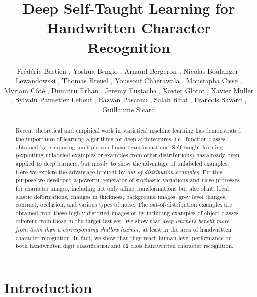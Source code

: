 \documentclass{article} %
\title{Deep Self-Taught Learning for Handwritten Character Recognition}
\author{
Frédéric  Bastien , 
Yoshua  Bengio , 
Arnaud  Bergeron , 
Nicolas  Boulanger-Lewandowski ,
Thomas  Breuel , 
Youssouf  Chherawala , 
Moustapha  Cisse , 
Myriam  Côté , 
Dumitru  Erhan ,
Jeremy  Eustache ,
Xavier  Glorot , 
Xavier  Muller ,
Sylvain  Pannetier Lebeuf ,
Razvan  Pascanu , 
Salah  Rifai , 
Francois  Savard , 
Guillaume  Sicard 
}
\begin{document}
\maketitle

\vspace*{-2mm}
\begin{abstract}
  Recent theoretical and empirical work in statistical machine learning has
  demonstrated the importance of learning algorithms for deep
  architectures, i.e., function classes obtained by composing multiple
  non-linear transformations. Self-taught learning (exploiting unlabeled
  examples or examples from other distributions) has already been applied
  to deep learners, but mostly to show the advantage of unlabeled
  examples. Here we explore the advantage brought by {\em out-of-distribution examples}.
For this purpose we
  developed a powerful generator of stochastic variations and noise
  processes for character images, including not only affine transformations
  but also slant, local elastic deformations, changes in thickness,
  background images, grey level changes, contrast, occlusion, and various
  types of noise. The out-of-distribution examples are obtained from these
  highly distorted images or by including examples of object classes
  different from those in the target test set.
  We show that {\em deep learners benefit
    more from them than a corresponding shallow learner}, at least in the area of
  handwritten character recognition. In fact, we show that they reach
  human-level performance on both handwritten digit classification and
  62-class handwritten character recognition.  
\end{abstract}
\vspace*{-3mm}

\section{Introduction}
\vspace*{-1mm}
\end{document}

